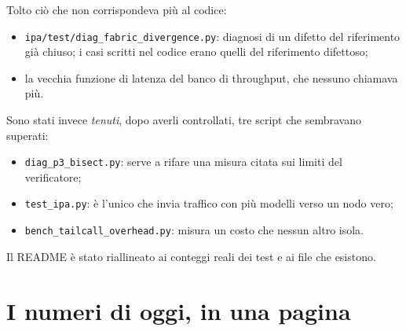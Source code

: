 \documentclass[11pt,a4paper,oneside]{report}
\begin{document}
Tolto ciò che non corrispondeva più al codice:
\begin{itemize}
  \item \texttt{ipa/test/diag\_fabric\_divergence.py}: diagnosi di un difetto del
        riferimento già chiuso; i casi scritti nel codice erano quelli del
        riferimento difettoso;
  \item la vecchia funzione di latenza del banco di throughput, che nessuno
        chiamava più.
\end{itemize}
Sono stati invece \emph{tenuti}, dopo averli controllati, tre script che
sembravano superati:
\begin{itemize}
  \item \texttt{diag\_p3\_bisect.py}: serve a rifare una misura citata sui limiti
        del verificatore;
  \item \texttt{test\_ipa.py}: è l'unico che invia traffico con più modelli verso
        un nodo vero;
  \item \texttt{bench\_tailcall\_overhead.py}: misura un costo che nessun altro
        isola.
\end{itemize}
Il README è stato riallineato ai conteggi reali dei test e ai file che esistono.

\chapter{I numeri di oggi, in una pagina}
\label{ch:numeri}
\end{document}
